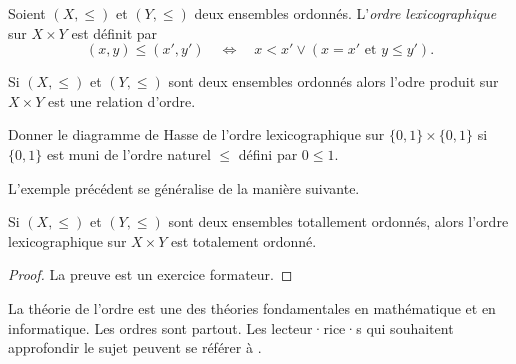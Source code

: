 \documentclass[french,course,oneside,theoremnosection]{lecture}
\newenvironment{further}[1]
{\begin{tcolorbox}[colframe=gray!50, colback=gray!5, arc=0pt, outer arc=0pt, boxrule=0.5pt, title=#1, breakable]}
{\end{tcolorbox}}
\begin{document}
\begin{definition}
Soient $(X, \leq)$ et $(Y,\leq)$ deux ensembles ordonnés. L'\emph{ordre lexicographique} sur $X\times Y$ est définit par
\[
(x,y) \leq (x',y') \quad \iff \quad x< x' \vee (x=x' \text{ et } y\leq y').
\]
\end{definition}

\begin{lemma}
Si $(X,\leq)$ et $(Y, \leq)$ sont deux ensembles ordonnés alors l'odre produit sur $X\times Y$ est une relation d'ordre.
\end{lemma}

\begin{example}
Donner le diagramme de Hasse de l'ordre lexicographique sur $\{0,1\}\times \{0,1\}$ si $\{0,1\}$ est muni de l'ordre naturel $\leq$ défini par $0\leq 1$.
\end{example}

L'exemple précédent se généralise de la manière suivante.

\begin{proposition}
Si $(X, \leq)$ et $(Y,\leq)$ sont deux ensembles totallement ordonnés, alors l'ordre lexicographique sur $X\times Y$ est totalement ordonné.
\end{proposition}
\begin{proof}
La preuve est un exercice formateur.
\end{proof}

\begin{further}{Pour aller plus profond}
La théorie de l'ordre est une des théories fondamentales en mathématique et en informatique. Les ordres sont partout. Les lecteur·rice·s qui souhaitent approfondir le sujet peuvent se référer à \cite{Davey2002}.
\end{further}

%
%
%
%
\end{document}
